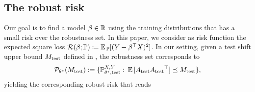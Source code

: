 \subsection{The robust risk}\label{sec:formulation-distributional-robustness}
Our goal is to find a model $\beta \in \mathbb{R}$ using the training distributions
that has a small risk
over the robustness set.
In this paper, we consider as risk function the expected square loss  $\mathcal{R}(\beta; \mathbb{P}) \coloneqq \mathbb{E}\,_{\mathbb{P}} [(Y - \beta^\top X)^2]$.
In our setting, given a test shift upper bound $M_{\mathrm{test}}$ defined in , the robustness set corresponds to
\begin{align}\label{eqn:robustness-set}
    \mathcal{P}_{\theta^{\star}}(M_{\mathrm{test}}) := \{ \mathbb{P}_{\theta^{\star}, \mathrm{test}}^{X,Y}: \:  \mathbb{E}\, [ A_{\text{test}} {A_{\text{test}}}^\top ] \preceq M_{\mathrm{test}} \},
\end{align}
yielding the corresponding robust risk that reads






